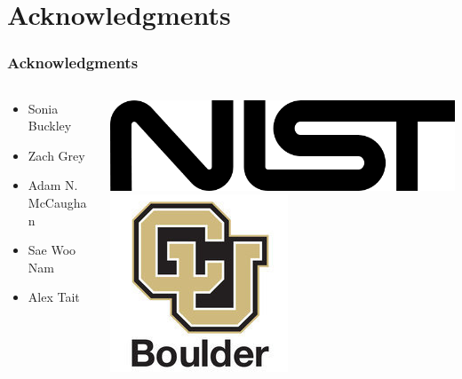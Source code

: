 \documentclass[pdf]{beamer}
\begin{document}
\section{Acknowledgments}
\begin{frame}
\frametitle{Acknowledgments}
\begin{columns}
\begin{column}{.48\textwidth}
	\begin{itemize}
		\item Sonia Buckley
		\item Zach Grey
		\item Adam N. McCaughan
		\item Sae Woo Nam
		\item Alex Tait
	\end{itemize}
\end{column}
\begin{column}{.48\textwidth}
	\includegraphics[width=.8\textwidth]{figures/nist_logo.png}
	\\\vspace{.5cm}
	\includegraphics[width=.8\textwidth]{figures/cu_logo.jpg}
\end{column}
\end{columns}
\end{frame}
\end{document}
